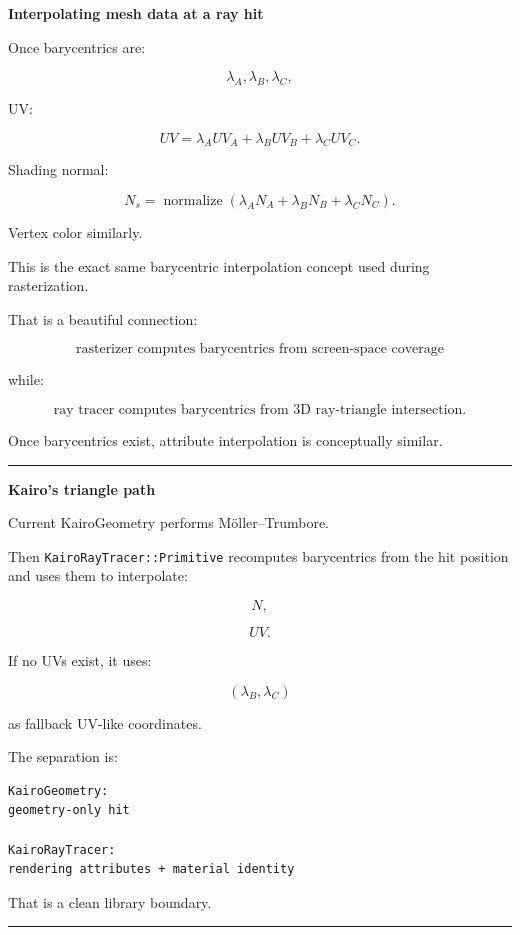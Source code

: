 \textbf{Interpolating mesh data at a ray hit}

Once barycentrics are:

\[
\lambda_A,\lambda_B,\lambda_C,
\]

UV:

\[
\boxed{
UV=
\lambda_AUV_A+
\lambda_BUV_B+
\lambda_CUV_C.
}
\]

Shading normal:

\[
\boxed{
N_s=
\operatorname{normalize}
(
\lambda_AN_A+
\lambda_BN_B+
\lambda_CN_C
).
}
\]

Vertex color similarly.

This is the exact same barycentric interpolation concept used during rasterization.

That is a beautiful connection:

\[
\boxed{
\text{rasterizer computes barycentrics from screen-space coverage}
}
\]

while:

\[
\boxed{
\text{ray tracer computes barycentrics from 3D ray-triangle intersection}.
}
\]

Once barycentrics exist, attribute interpolation is conceptually similar.

\begin{center}\rule{0.5\linewidth}{0.5pt}\end{center}

\textbf{Kairo's triangle path}

Current KairoGeometry performs Möller--Trumbore.

Then \texttt{KairoRayTracer::Primitive} recomputes barycentrics from the hit position and uses them to interpolate:

\[
N,
\]

\[
UV.
\]

If no UVs exist, it uses:

\[
(\lambda_B,\lambda_C)
\]

as fallback UV-like coordinates.

The separation is:

\begin{verbatim}
KairoGeometry:
geometry-only hit

KairoRayTracer:
rendering attributes + material identity
\end{verbatim}

That is a clean library boundary.

\begin{center}\rule{0.5\linewidth}{0.5pt}\end{center}

